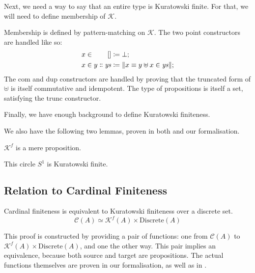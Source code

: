Next, we need a way to say that an entire type is Kuratowski finite.
For that, we will need to define membership of \(\mathcal{K}\).
\begin{definition}
  Membership is defined by pattern-matching on \(\mathcal{K}\).
  The two point constructors are handled like so: 
  \begin{equation}
    \begin{alignedat}{2}
      x \in&& \; []                      &\coloneqq \bot ; \\
      x \in&& \; y \dblcolon \mathit{ys} &\coloneqq \lVert x \equiv y \uplus x \in \mathit{ys} \rVert ;
    \end{alignedat}
  \end{equation}
  The \(\text{com}\) and \(\text{dup}\) constructors are handled by proving that
  the truncated form of \(\uplus\) is itself commutative and idempotent.
  The type of propositions is itself a set, satisfying the \(\text{trunc}\)
  constructor.
\end{definition}
Finally, we have enough background to define Kuratowski finiteness.
\begin{definition} \phantom{break}
  \begin{agdalisting}
  \end{agdalisting}
\end{definition}

We also have the following two lemmas, proven in both
\cite{fruminFiniteSetsHomotopy2018} and our formalisation.
\begin{lemma}
  \(\mathcal{K}^f\) is a mere proposition.
\end{lemma}
\begin{lemma}
  This circle \(S^1\) is Kuratowski finite.
\end{lemma}
\subsection{Relation to Cardinal Finiteness}
\begin{lemma} \label{cardinal-kuratowski}
  Cardinal finiteness is equivalent to Kuratowski finiteness over a discrete
  set.
  \begin{equation}
    \mathcal{C}(A) \simeq \mathcal{K}^f(A) \times \text{Discrete}(A)
  \end{equation}
\end{lemma}
This proof is constructed by providing a pair of functions: one from
\(\mathcal{C}(A)\) to \(\mathcal{K}^f(A) \times \text{Discrete}(A)\), and one the
other way.
This pair implies an equivalence, because both source and target are
propositions.
The actual functions themselves are proven in our formalisation, as well as in
\cite{fruminFiniteSetsHomotopy2018}.


